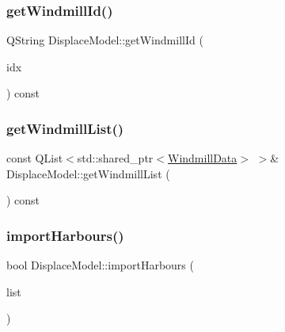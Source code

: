 \subsubsection{\texorpdfstring{getWindmillId()}{getWindmillId()}}
{\footnotesize\ttfamily Q\+String Displace\+Model\+::get\+Windmill\+Id (\begin{DoxyParamCaption}\item[{int}]{idx }\end{DoxyParamCaption}) const}

\mbox{\label{class_displace_model_a8e6483b053022348ae9ef2f3ebb12cf8}} 
\subsubsection{\texorpdfstring{getWindmillList()}{getWindmillList()}}
{\footnotesize\ttfamily const Q\+List$<$std\+::shared\+\_\+ptr$<$\mbox{\hyperlink{class_windmill_data}{Windmill\+Data}}$>$ $>$\& Displace\+Model\+::get\+Windmill\+List (\begin{DoxyParamCaption}{ }\end{DoxyParamCaption}) const\hspace{0.3cm}{\ttfamily [inline]}}

\mbox{\label{class_displace_model_a0b5af1c3b6db271becbf4bd9de91d87b}} 
\subsubsection{\texorpdfstring{importHarbours()}{importHarbours()}}
{\footnotesize\ttfamily bool Displace\+Model\+::import\+Harbours (\begin{DoxyParamCaption}\item[{Q\+List$<$ std\+::shared\+\_\+ptr$<$ \mbox{\hyperlink{class_harbour_data}{Harbour\+Data}} $>$ $>$ \&}]{list }\end{DoxyParamCaption})}

\mbox{\label{class_displace_model_a7b72dd7bd7feb010720a35f080f23407}} 
